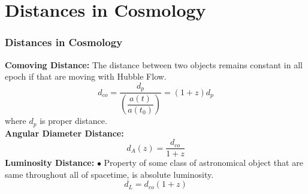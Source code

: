 \documentclass[xcolor=table,bigger]{beamer}
\begin{document}
\section{ Distances in Cosmology}
\begin{frame}
 \frametitle{Distances in Cosmology}
 \vspace{3mm}
 \vspace{3mm}
 \textbf{Comoving Distance: } The distance between two objects remains constant in all epoch if that are moving with Hubble Flow.
$$ d_{c o}=\dfrac{d_{p}}{\left(\dfrac{a(t)}{a\left(t_{0}\right)}\right)}=(1+z) d_{p}$$
where $d_p$ is proper distance.\\
  \textbf{Angular Diameter Distance:} 
$$
 d_{A}\left(z\right)=\dfrac{d_{c o}}{1+z}
 $$
  \textbf{Luminosity Distance:}
 $\bullet$ Property of some class of astronomical object that are same throughout all of spacetime, is absolute luminosity.
 $$d_{L}=d_{c o}^{}(1+z)$$
 \end{frame}
\end{document}
